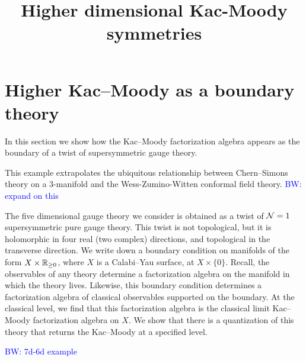 \documentclass[10pt]{amsart}
\title{Higher dimensional Kac-Moody symmetries}
\def\brian{\textcolor{blue}{BW: }\textcolor{blue}}
\begin{document}

\section{Higher Kac--Moody as a boundary theory}

In this section we show how the Kac--Moody factorization algebra appears as the boundary of a twist of supersymmetric gauge theory.

This example extrapolates the ubiquitous relationship between Chern--Simons theory on a $3$-manifold and the Wess-Zumino-Witten conformal field theory.
\brian{expand on this}

The five dimensional gauge theory we consider is obtained as a twist of $\mathcal N=1$ supersymmetric pure gauge theory.
This twist is not topological, but it is holomorphic in four real (two complex) directions, and topological in the transverse direction.
We write down a boundary condition on manifolds of the form $X \times \mathbb R_{\geq 0}$, where $X$ is a Calabi--Yau surface, at $X \times \{0\}$.
Recall, the observables of any theory determine a factorization algebra on the manifold in which the theory lives. 
Likewise, this boundary condition determines a factorization algebra of classical observables supported on the boundary. 
At the classical level, we find that this factorization algebra is the classical limit Kac--Moody factorization algebra on $X$.
We show that there is a quantization of this theory that returns the Kac--Moody at a specified level.  

\begin{rmk} \brian{7d-6d example}
\end{rmk}

%
%
\end{document}
